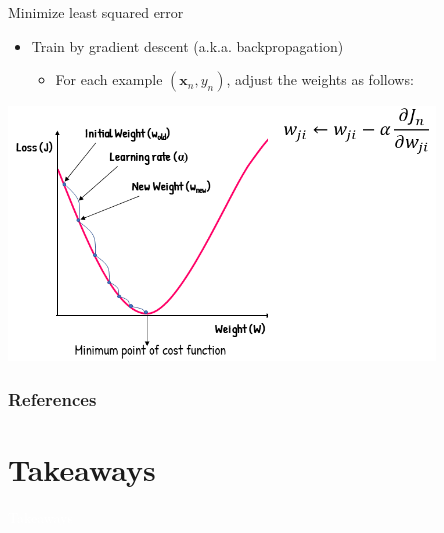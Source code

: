 \documentclass[11pt,table]{beamer}
\begin{document}
\begin{frame}{Minimize	least squared error}

\begin{itemize}
    \item Train by gradient descent (a.k.a. backpropagation)
\begin{itemize}
    \item For each example $(\boldsymbol{x}_{n}, y_{n})$, adjust the weights as follows:
 
\end{itemize} 
\end{itemize}

\begin{center}
   \includegraphics[width=0.85\textwidth]{figures/9.PNG} 
\end{center}
    
\end{frame}


\begin{frame}[t,allowframebreaks
]%
\frametitle{References}
\small

\end{frame}
\section{Takeaways}
{
\begin{frame}
\centering
\Huge
\textcolor{white}{Takeaways}
\thispagestyle{empty}
\end{frame}
}
\end{document}
